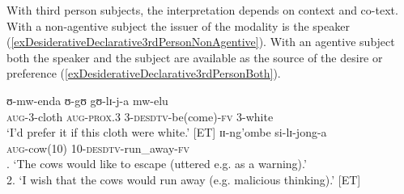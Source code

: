 With third person subjects, the interpretation depends on context and co-text. With a non-agentive subject the issuer of the modality is the speaker (\ref{exDesiderativeDeclarative3rdPersonNonAgentive}). With an agentive subject both the speaker and the subject are available as the source of the desire or preference  (\ref{exDesiderativeDeclarative3rdPersonBoth}).

\begin{exe}
\ex\label{exDesiderativeDeclarative3rdPersonNonAgentive}\gll ʊ-mw-enda ʊ-gʊ gʊ-lɪ-j-a mw-elu\\
\textsc{aug}-3-cloth \textsc{aug}-\textsc{prox.3} 3-\textsc{desdtv}-be(come)-\textsc{fv} 3-white\\
\glt `I'd prefer it if this cloth were white.' [ET]
\ex\label{exDesiderativeDeclarative3rdPersonBoth} \gll ɪɪ-ng'ombe si-lɪ-jong-a\\
\textsc{aug}-cow(10) 10-\textsc{desdtv}-run\_away-\textsc{fv}\\
. `The cows would like to escape (uttered e.g. as a warning).'\\
2. `I wish that the cows would run away (e.g. malicious thinking).' [ET]
\end{exe}

